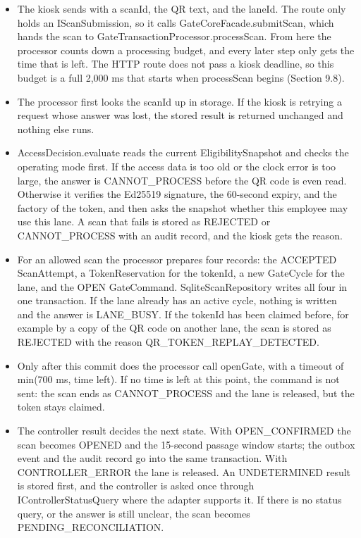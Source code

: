 \begin{itemize}[leftmargin=36pt, labelwidth=22pt, labelsep=8pt, align=left, itemsep=3pt, topsep=4pt, parsep=2pt]
  \item[\textbf{A1}] The kiosk sends  with a scanId, the QR text, and the laneId. The route only holds an IScanSubmission, so it calls GateCoreFacade.submitScan, which hands the scan to GateTransactionProcessor.processScan. From here the processor counts down a processing budget, and every later step only gets the time that is left. The HTTP route does not pass a kiosk deadline, so this budget is a full 2,000 ms that starts when processScan begins (Section 9.8).
  \item[\textbf{A2}] The processor first looks the scanId up in storage. If the kiosk is retrying a request whose answer was lost, the stored result is returned unchanged and nothing else runs.
  \item[\textbf{A3}] AccessDecision.evaluate reads the current EligibilitySnapshot and checks the operating mode first. If the access data is too old or the clock error is too large, the answer is CANNOT\_PROCESS before the QR code is even read. Otherwise it verifies the Ed25519 signature, the 60-second expiry, and the factory of the token, and then asks the snapshot whether this employee may use this lane. A scan that fails is stored as REJECTED or CANNOT\_PROCESS with an audit record, and the kiosk gets the reason.
  \item[\textbf{A4}] For an allowed scan the processor prepares four records: the ACCEPTED ScanAttempt, a TokenReservation for the tokenId, a new GateCycle for the lane, and the OPEN GateCommand. SqliteScanRepository writes all four in one transaction. If the lane already has an active cycle, nothing is written and the answer is LANE\_BUSY. If the tokenId has been claimed before, for example by a copy of the QR code on another lane, the scan is stored as REJECTED with the reason QR\_TOKEN\_REPLAY\_DETECTED.
  \item[\textbf{A5}] Only after this commit does the processor call openGate, with a timeout of min(700 ms, time left). If no time is left at this point, the command is not sent: the scan ends as CANNOT\_PROCESS and the lane is released, but the token stays claimed.
  \item[\textbf{A6}] The controller result decides the next state. With OPEN\_CONFIRMED the scan becomes OPENED and the 15-second passage window starts; the outbox event and the audit record go into the same transaction. With CONTROLLER\_ERROR the lane is released. An UNDETERMINED result is stored first, and the controller is asked once through IControllerStatusQuery where the adapter supports it. If there is no status query, or the answer is still unclear, the scan becomes PENDING\_RECONCILIATION.

\end{itemize}
